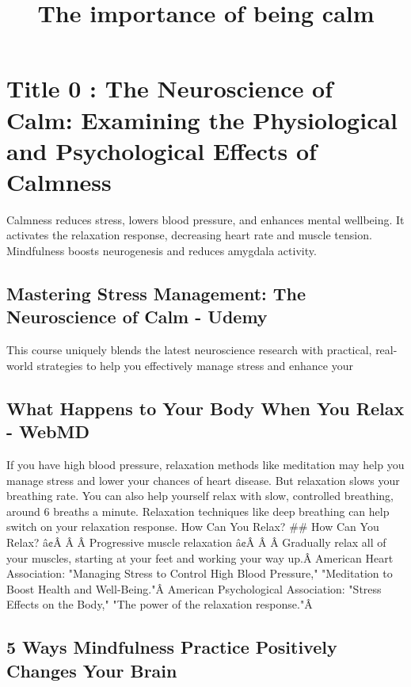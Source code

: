 \documentclass[12pt]{article}
\title{The importance of being calm}
\author{}
\date{}
\begin{document}
\maketitle

\section{Title 0 : The Neuroscience of Calm: Examining the Physiological and Psychological Effects of Calmness}
Calmness reduces stress, lowers blood pressure, and enhances mental wellbeing. It activates the relaxation response, decreasing heart rate and muscle tension. Mindfulness boosts neurogenesis and reduces amygdala activity.\subsection{Mastering Stress Management: The Neuroscience of Calm - Udemy}
This course uniquely blends the latest neuroscience research with practical, real-world strategies to help you effectively manage stress and enhance your\subsection{What Happens to Your Body When You Relax - WebMD}
If you have high blood pressure, relaxation methods like meditation may help you manage stress and lower your chances of heart disease. But relaxation slows your breathing rate. You can also help yourself relax with slow, controlled breathing, around 6 breaths a minute. Relaxation techniques like deep breathing can help switch on your relaxation response. How Can You Relax? \#\# How Can You Relax? â¢Â Â  Â Progressive muscle relaxation   â¢Â Â  Â Gradually relax all of your muscles, starting at your feet and working your way up.Â    American Heart Association: "Managing Stress to Control High Blood Pressure," "Meditation to Boost Health and Well-Being."Â American Psychological Association: "Stress Effects on the Body," "The power of the relaxation response."Â\subsection{5 Ways Mindfulness Practice Positively Changes Your Brain}
\end{document}
